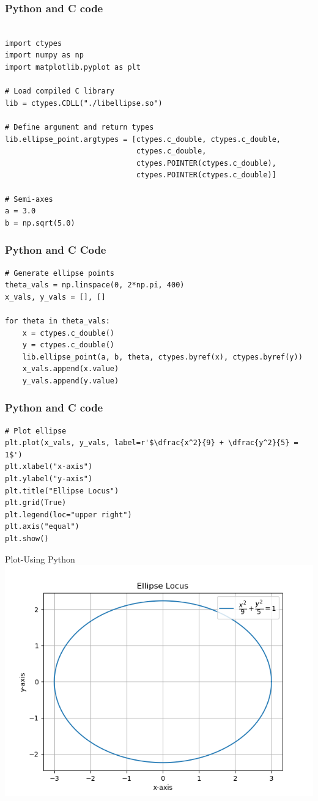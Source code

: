 \documentclass{beamer}
\begin{document}
\begin{frame}[fragile]
    \frametitle{Python and C code}
    \begin{lstlisting}

import ctypes
import numpy as np
import matplotlib.pyplot as plt

# Load compiled C library
lib = ctypes.CDLL("./libellipse.so")

# Define argument and return types
lib.ellipse_point.argtypes = [ctypes.c_double, ctypes.c_double,
                              ctypes.c_double,
                              ctypes.POINTER(ctypes.c_double),
                              ctypes.POINTER(ctypes.c_double)]

# Semi-axes
a = 3.0
b = np.sqrt(5.0)
\end{lstlisting}
\end{frame}


\begin{frame}[fragile]
    \frametitle{Python and C  Code}
    \begin{lstlisting}
# Generate ellipse points
theta_vals = np.linspace(0, 2*np.pi, 400)
x_vals, y_vals = [], []

for theta in theta_vals:
    x = ctypes.c_double()
    y = ctypes.c_double()
    lib.ellipse_point(a, b, theta, ctypes.byref(x), ctypes.byref(y))
    x_vals.append(x.value)
    y_vals.append(y.value)
\end{lstlisting}
\end{frame}


\begin{frame}[fragile]
    \frametitle{Python and C code}
    \begin{lstlisting}
# Plot ellipse
plt.plot(x_vals, y_vals, label=r'$\dfrac{x^2}{9} + \dfrac{y^2}{5} = 1$')
plt.xlabel("x-axis")
plt.ylabel("y-axis")
plt.title("Ellipse Locus")
plt.grid(True)
plt.legend(loc="upper right")
plt.axis("equal")
plt.show()
\end{lstlisting}
\end{frame}
\begin{frame}{Plot-Using Python}
    \centering
    \includegraphics[width=\columnwidth, height=0.8\textheight, keepaspectratio]{figs/fig9.png}     
\end{frame}
\end{document}
